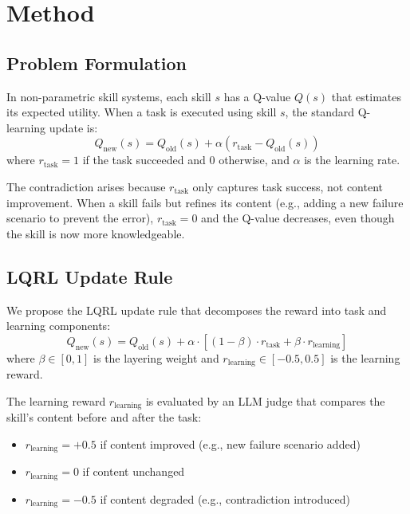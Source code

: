 \section{Method}
\label{sec:method}

\subsection{Problem Formulation}

In non-parametric skill systems, each skill $s$ has a Q-value $Q(s)$ that estimates its expected utility. When a task is executed using skill $s$, the standard Q-learning update is:
\begin{equation}
    Q_{\text{new}}(s) = Q_{\text{old}}(s) + \alpha (r_{\text{task}} - Q_{\text{old}}(s))
\end{equation}
where $r_{\text{task}} = 1$ if the task succeeded and $0$ otherwise, and $\alpha$ is the learning rate.

The contradiction arises because $r_{\text{task}}$ only captures task success, not content improvement. When a skill fails but refines its content (e.g., adding a new failure scenario to prevent the error), $r_{\text{task}} = 0$ and the Q-value decreases, even though the skill is now more knowledgeable.

\subsection{LQRL Update Rule}

We propose the LQRL update rule that decomposes the reward into task and learning components:
\begin{equation}
    Q_{\text{new}}(s) = Q_{\text{old}}(s) + \alpha \cdot [(1-\beta) \cdot r_{\text{task}} + \beta \cdot r_{\text{learning}}]
    \label{eq:lqrl}
\end{equation}
where $\beta \in [0, 1]$ is the layering weight and $r_{\text{learning}} \in [-0.5, 0.5]$ is the learning reward.

The learning reward $r_{\text{learning}}$ is evaluated by an LLM judge that compares the skill's content before and after the task:
\begin{itemize}
    \item $r_{\text{learning}} = +0.5$ if content improved (e.g., new failure scenario added)
    \item $r_{\text{learning}} = 0$ if content unchanged
    \item $r_{\text{learning}} = -0.5$ if content degraded (e.g., contradiction introduced)
\end{itemize}

